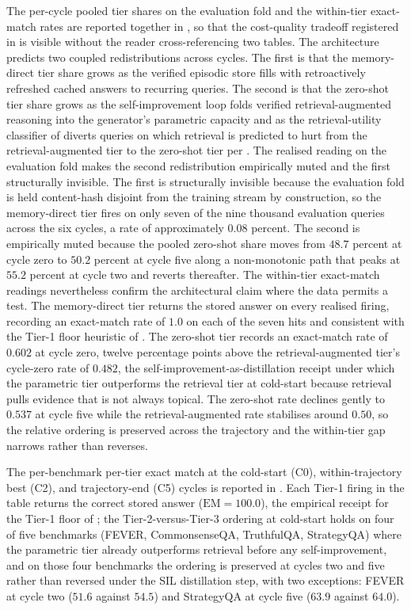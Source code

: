 The per-cycle pooled tier shares on the evaluation fold and the within-tier exact-match rates are reported together in , so that the cost-quality tradeoff registered in  is visible without the reader cross-referencing two tables. The architecture predicts two coupled redistributions across cycles. The first is that the memory-direct tier share grows as the verified episodic store fills with retroactively refreshed cached answers to recurring queries. The second is that the zero-shot tier share grows as the self-improvement loop folds verified retrieval-augmented reasoning into the generator's parametric capacity and as the retrieval-utility classifier of  diverts queries on which retrieval is predicted to hurt from the retrieval-augmented tier to the zero-shot tier per . The realised reading on the evaluation fold makes the second redistribution empirically muted and the first structurally invisible. The first is structurally invisible because the evaluation fold is held content-hash disjoint from the training stream by construction, so the memory-direct tier fires on only seven of the nine thousand evaluation queries across the six cycles, a rate of approximately $0.08$ percent. The second is empirically muted because the pooled zero-shot share moves from $48.7$ percent at cycle zero to $50.2$ percent at cycle five along a non-monotonic path that peaks at $55.2$ percent at cycle two and reverts thereafter. The within-tier exact-match readings nevertheless confirm the architectural claim where the data permits a test. The memory-direct tier returns the stored answer on every realised firing, recording an exact-match rate of $1.0$ on each of the seven hits and consistent with the Tier-1 floor heuristic of . The zero-shot tier records an exact-match rate of $0.602$ at cycle zero, twelve percentage points above the retrieval-augmented tier's cycle-zero rate of $0.482$, the self-improvement-as-distillation receipt under which the parametric tier outperforms the retrieval tier at cold-start because retrieval pulls evidence that is not always topical. The zero-shot rate declines gently to $0.537$ at cycle five while the retrieval-augmented rate stabilises around $0.50$, so the relative ordering is preserved across the trajectory and the within-tier gap narrows rather than reverses.



The per-benchmark per-tier exact match at the cold-start (C0), within-trajectory best (C2), and trajectory-end (C5) cycles is reported in . Each Tier-1 firing in the table returns the correct stored answer ($\mathrm{EM} = 100.0$), the empirical receipt for the Tier-1 floor of ; the Tier-2-versus-Tier-3 ordering at cold-start holds on four of five benchmarks (FEVER, CommonsenseQA, TruthfulQA, StrategyQA) where the parametric tier already outperforms retrieval before any self-improvement, and on those four benchmarks the ordering is preserved at cycles two and five rather than reversed under the SIL distillation step, with two exceptions: FEVER at cycle two ($51.6$ against $54.5$) and StrategyQA at cycle five ($63.9$ against $64.0$).

